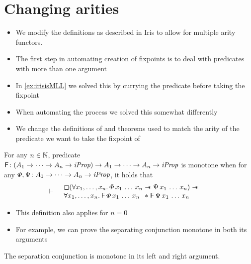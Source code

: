 \documentclass[thesis.tex]{subfiles}
\begin{document}
\section{Changing arities}
\begin{itemize}
    \item We modify the definitions as described in Iris to allow for multiple arity functors.
\end{itemize}
\begin{itemize}
    \item The first step in automating creation of fixpoints is to deal with predicates with more than one argument
    \item In \cref*{ex:irisisMLL} we solved this by currying the predicate before taking the fixpoint
    \item When automating the process we solved this somewhat differently
    \item We change the definitions of and theorems used to match the arity of the predicate we want to take the fixpoint of
\end{itemize}
\begin{definition}
    For any $n\in\mathbb{N}$, predicate $\textsf{\upshape F}\colon (A_1 \to \dots \to A_n \to \textit{iProp}) \to A_1 \to \dots \to A_n \to \textit{iProp}$ is monotone when for any $\varPhi, \Psi\colon A_1 \to \dots \to A_n \to \textit{iProp}$, it holds that
    \begin{align*}
        \proves &
        \begin{array}{rl}
             & \always(\All \var_1,\dots,\var_n. \pred\,\var_1\,\dots\,\var_n \wand \predB\,\var_1\,\dots\,\var_n) \wand   \\
             & \All\var_1,\dots,\var_n. \hopred\,\pred\,\var_1\,\dots\,\var_n \wand \hopred\,\predB\,\var_1\,\dots\,\var_n
        \end{array}
    \end{align*}
\end{definition}
\begin{itemize}
    \item This definition also applies for $n=0$
    \item For example, we can prove the separating conjunction monotone in both its arguments
\end{itemize}
\begin{lemma}
    \label{lem:sepmonomar}
    The separation conjunction is monotone in its left and right argument.
\end{lemma}
\end{document}
